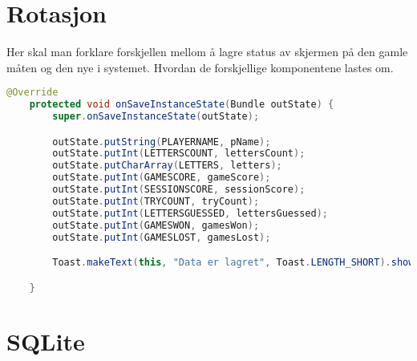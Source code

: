 \section{Rotasjon}
Her skal man forklare forskjellen mellom å lagre status av skjermen på den gamle måten og den nye i systemet. Hvordan de forskjellige komponentene lastes om. 
\begin{lstlisting}[language=Java]
    @Override
    protected void onSaveInstanceState(Bundle outState) {
        super.onSaveInstanceState(outState);

        outState.putString(PLAYERNAME, pName);
        outState.putInt(LETTERSCOUNT, lettersCount);
        outState.putCharArray(LETTERS, letters);
        outState.putInt(GAMESCORE, gameScore);
        outState.putInt(SESSIONSCORE, sessionScore);
        outState.putInt(TRYCOUNT, tryCount);
        outState.putInt(LETTERSGUESSED, lettersGuessed);
        outState.putInt(GAMESWON, gamesWon);
        outState.putInt(GAMESLOST, gamesLost);

        Toast.makeText(this, "Data er lagret", Toast.LENGTH_SHORT).show();

    }
\end{lstlisting}

\section{SQLite}
